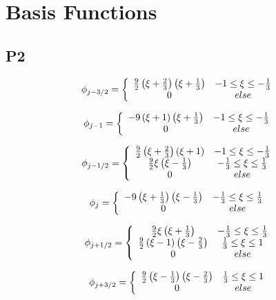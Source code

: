 \documentclass[12pt]{article}
\begin{document}
\section{Basis Functions}

\subsection{P2}

\[\phi_{j-3/2} =  \left\lbrace \begin{array}{c c}
\frac{9}{2}\left(\xi + \frac{2}{3}\right)\left(\xi + \frac{1}{3}\right) & -1 \le \xi \le -\frac{1}{3}\\
0 & else
\end{array} \right. \]

\[\phi_{j-1} =  \left\lbrace \begin{array}{c c}
-9\left(\xi + 1\right)\left(\xi + \frac{1}{3}\right) & -1 \le \xi \le -\frac{1}{3}\\
0 & else
\end{array} \right. \]

\[\phi_{j-1/2} =  \left\lbrace \begin{array}{c c}
\frac{9}{2}\left(\xi + \frac{2}{3}\right)\left(\xi + 1\right) & -1 \le \xi \le -\frac{1}{3} \\
\frac{9}{2}\xi\left(\xi - \frac{1}{3}\right)  & -\frac{1}{3} \le \xi \le \frac{1}{3}\\
0 & else
\end{array} \right. \]

\[\phi_{j} =  \left\lbrace \begin{array}{c c}
-9\left(\xi + \frac{1}{3}\right)\left(\xi - \frac{1}{3}\right) & -\frac{1}{3} \le \xi \le \frac{1}{3}\\
0 & else
\end{array} \right. \]

\[\phi_{j+1/2} =  \left\lbrace \begin{array}{c c}
\frac{9}{2}\xi\left(\xi + \frac{1}{3}\right)  & -\frac{1}{3} \le \xi \le \frac{1}{3}\\
\frac{9}{2}\left(\xi -1 \right)\left(\xi -\frac{2}{3}\right) & \frac{1}{3} \le \xi \le 1 \\
0 & else
\end{array} \right. \]

\[\phi_{j+3/2} =  \left\lbrace \begin{array}{c c}
\frac{9}{2}\left(\xi - \frac{1}{3}\right)\left(\xi - \frac{2}{3}\right) & \frac{1}{3} \le \xi \le 1\\
0 & else
\end{array} \right. \]
\end{document}
